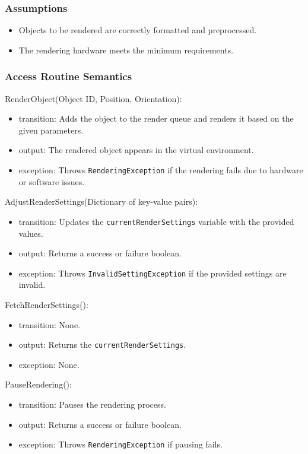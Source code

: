 \documentclass[12pt, titlepage]{article}
\begin{document}
\subsubsection{Assumptions}

\begin{itemize}
    \item Objects to be rendered are correctly formatted and preprocessed.
    \item The rendering hardware meets the minimum requirements.
\end{itemize}

\subsubsection{Access Routine Semantics}

\noindent RenderObject(Object ID, Position, Orientation):
\begin{itemize}
    \item transition: Adds the object to the render queue and renders it based on the given parameters.
    \item output: The rendered object appears in the virtual environment.
    \item exception: Throws \texttt{RenderingException} if the rendering fails due to hardware or software issues.
\end{itemize}

\noindent AdjustRenderSettings(Dictionary of key-value pairs):
\begin{itemize}
    \item transition: Updates the \texttt{currentRenderSettings} variable with the provided values.
    \item output: Returns a success or failure boolean.
    \item exception: Throws \texttt{InvalidSettingException} if the provided settings are invalid.
\end{itemize}

\noindent FetchRenderSettings():
\begin{itemize}
    \item transition: None.
    \item output: Returns the \texttt{currentRenderSettings}.
    \item exception: None.
\end{itemize}

\noindent PauseRendering():
\begin{itemize}
    \item transition: Pauses the rendering process.
    \item output: Returns a success or failure boolean.
    \item exception: Throws \texttt{RenderingException} if pausing fails.
\end{itemize}
\end{document}
